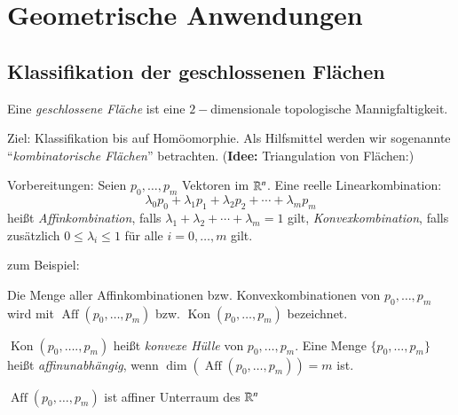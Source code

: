 \documentclass[a4paper,10pt]{scrartcl}
\begin{document}
\section{Geometrische Anwendungen}
\subsection{Klassifikation der geschlossenen Flächen}
\begin{df}
 Eine \emph{geschlossene Fläche} ist eine $2-$dimensionale topologische Mannigfaltigkeit.

 \begin{figure}[H]
 \centering
\fixme[fig115]
\caption{}
\end{figure}
\end{df}

\begin{seg}{Ziel:}
Klassifikation bis auf Homöomorphie. Als Hilfsmittel werden wir sogenannte "`\emph{kombinatorische  Flächen}"' betrachten. (\textbf{Idee:} Triangulation von Flächen:)
 \begin{figure}[H]
 \centering
\fixme[fig116]
\caption{}
\end{figure}
\end{seg}
\begin{seg}{Vorbereitungen:}
 Seien $p_0, \dotsc  , p_m$ Vektoren im $\mathbb{R}^n$. Eine reelle Linearkombination:
\[
 \lambda_0p_0+\lambda_1p_1+\lambda_2p_2+\dotsb +\lambda_mp_m
\]
heißt \emph{Affinkombination}, falls $\lambda_1+\lambda_2+\dotsb +\lambda_m=1$ gilt, \emph{Konvexkombination}, falls zusätzlich $0\le \lambda_i\le 1$ für alle $i=0,\dotsc  , m$ gilt.

zum Beispiel:
 \begin{figure}[H]
 \centering
\fixme[fig117]
\caption{}
\end{figure}
Die Menge aller Affinkombinationen bzw. Konvexkombinationen von $p_0,\dotsc  , p_m$ wird mit $\operatorname{Aff}(p_0,\dotsc  ,p_m)$ bzw. $\operatorname{Kon}(p_0,\dotsc  ,p_m)$ bezeichnet.
 \begin{figure}[H]
 \centering
\fixme[fig118]
\caption{}
\end{figure}
$\operatorname{Kon}(p_0,\dotsc  .,p_m)$ heißt \emph{konvexe Hülle} von $p_0,\dotsc  ,p_m$. Eine Menge $\{p_0,\dotsc  ,p_m\}$ heißt \emph{affinunabhängig}, wenn $\dim(\operatorname{Aff}(p_0,\dotsc  ,p_m))=m$ ist.
\end{seg}
\begin{note*}
 $\operatorname{Aff}(p_0,\dotsc  , p_m)$ ist affiner Unterraum des $\mathbb{R}^n$
\end{note*}
\end{document}
